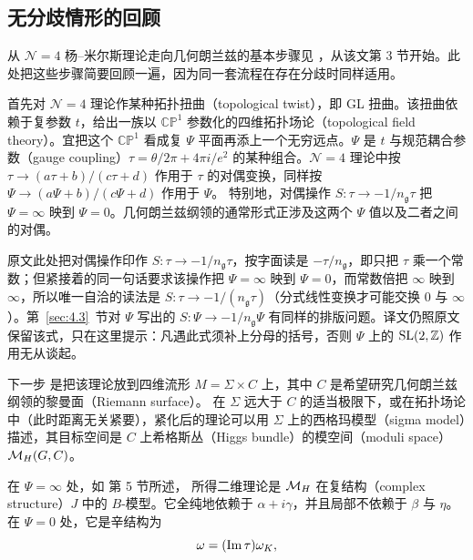 \subsection{无分歧情形的回顾}

\label{sec:4.1}

从 ${\mathcal N}=4$ 杨–米尔斯理论走向几何朗兰兹的基本步骤见 \cite{ref8}，从该文第 3 节开始。此处把这些步骤简要回顾一遍，因为同一套流程在存在分歧时同样适用。

首先对 ${\mathcal N}=4$ 理论作某种拓扑扭曲（topological twist），即 GL 扭曲。该扭曲依赖于复参数 $t$，给出一族以 $\mathbb{CP}^1$ 参数化的四维拓扑场论（topological field theory）。宜把这个 $\mathbb{CP}^1$ 看成复 $\Psi$ 平面再添上一个无穷远点。$\Psi$ 是 $t$ 与规范耦合参数（gauge coupling）$\tau=\theta/2\pi+4\pi i/e^2$ 的某种组合。${\mathcal N}=4$ 理论中按
$\tau\to (a\tau+b)/(c\tau+d)$ 作用于 $\tau$ 的对偶变换，同样按 $\Psi\to (a\Psi+b)/(c\Psi+d)$ 作用于 $\Psi$。
特别地，对偶操作 $S:\tau\to -1/n_{\mathfrak g}\tau$ 把 $\Psi=\infty$
映到 $\Psi=0$。几何朗兰兹纲领的通常形式正涉及这两个 $\Psi$ 值以及二者之间的对偶。

\begin{yizhu}[原文疑误]
原文此处把对偶操作印作 $S:\tau\to -1/n_{\mathfrak g}\tau$，按字面读是 $-\tau/n_{\mathfrak g}$，即只把 $\tau$ 乘一个常数；但紧接着的同一句话要求该操作把 $\Psi=\infty$ 映到 $\Psi=0$，而常数倍把 $\infty$ 映到 $\infty$，所以唯一自洽的读法是 $S:\tau\to-1/(n_{\mathfrak g}\tau)$（分式线性变换才可能交换 $0$ 与 $\infty$）。第~\ref{sec:4.3}~节对 $\Psi$ 写出的 $S:\Psi\to-1/n_{\mathfrak g}\Psi$ 有同样的排版问题。译文仍照原文保留该式，只在这里提示：凡遇此式须补上分母的括号，否则 $\Psi$ 上的 $\mathrm{SL}(2,{\mathbb{Z}})$ 作用无从谈起。
\end{yizhu}

下一步 \cite{ref19,ref20}
是把该理论放到四维流形 $M=\Sigma\times C$ 上，其中 $C$
是希望研究几何朗兰兹纲领的黎曼面（Riemann surface）。
在 $\Sigma$ 远大于 $C$ 的适当极限下，或在拓扑场论中（此时距离无关紧要），紧化后的理论可以用
$\Sigma$ 上的西格玛模型（sigma model）描述，其目标空间是 $C$ 上希格斯丛（Higgs bundle）的模空间（moduli space）${{\mathcal{M}}_H}(G,C)$。

在 $\Psi=\infty$ 处，如 \cite{ref8} 第 5 节所述，
所得二维理论是 ${{\mathcal{M}}_H}$ 在复结构（complex structure）$J$ 中的 $B$-模型。它全纯地依赖于 $\alpha+i\gamma$，并且局部不依赖于 $\beta$ 与 $\eta$。
在 $\Psi=0$ 处，它是辛结构为
\setcounter{equation}{0}
\begin{equation}\label{eq:4.1}
  \omega=({\rm Im}\,\tau)\omega_K,
\end{equation}

